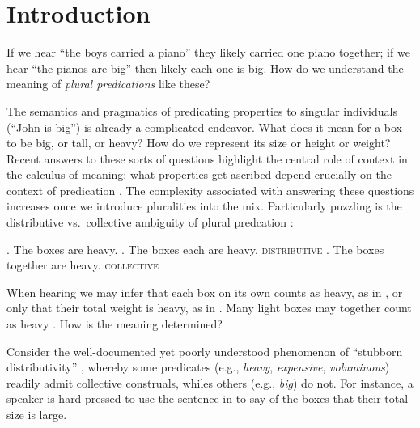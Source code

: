 \documentclass[linguex]{sp}
\begin{document}



\section{Introduction}

If we hear ``the boys carried a piano'' they likely carried one piano together; if we hear ``the pianos are big'' then likely each one is big. How do we understand the meaning of \emph{plural predications} like these?

The semantics and pragmatics of predicating properties to singular individuals (``John is big'') is already a complicated endeavor. What does it mean for a box to be big, or tall, or heavy? How do we represent its size or height or weight? Recent answers to these sorts of questions highlight the central role of context in the calculus of meaning: what properties get ascribed depend crucially on the context of predication \citep[cf.~tall for a boy vs.~tall for a basketball player;  e.g.,][]{kennedy1999,lassitergoodman2013}. The complexity associated with answering these questions increases once we introduce pluralities into the mix. 
Particularly puzzling is the distributive vs.~collective ambiguity of plural predcation \citep[e.g.,][]{link1983,link1987,link1998,scha1984,landman1989,landman1989b,landman1996,lasersohn1988,lasersohn1990,lasersohn1995,lasersohn1998,schwarzschild1994,schwarzschild1996}:

\ex. \label{boxes} The boxes are heavy.
\a. \label{boxeseach} The boxes each are heavy. \hfill \textsc{distributive}
\b. \label{boxestogether}The boxes together are heavy. \hfill \textsc{collective}

When hearing \Last we may infer that each box on its own counts as heavy, as in \Last[a], or only that their total weight is heavy, as in \Last[b]. Many light boxes may together count as heavy \citep{scha1984}.
How is the meaning determined?

Consider the well-documented yet poorly understood phenomenon of ``stubborn distributivity'' \citep{quine1960,schwarzschild2011,vazquezrojas2012,zhang2013,syrett2015}, whereby some predicates (e.g., \emph{heavy}, \emph{expensive}, \emph{voluminous}) readily admit collective construals, whiles others (e.g., \emph{big}) do not. 
For instance, a speaker is hard-pressed to use the sentence in \Next to say of the boxes that their total size is large.
\end{document}
